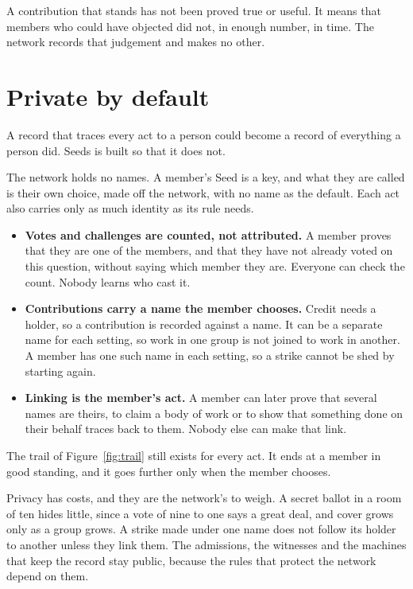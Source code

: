 \documentclass[11pt,a4paper]{article}
\begin{document}
A contribution that stands has not been proved true or useful. It means that members who could have objected did not, in enough number, in time. The network records that judgement and makes no other.

\section{Private by default}
\label{sec:private}

A record that traces every act to a person could become a record of everything a person did. Seeds is built so that it does not.

The network holds no names. A member's Seed is a key, and what they are called is their own choice, made off the network, with no name as the default. Each act also carries only as much identity as its rule needs.

\begin{itemize}
  \item \textbf{Votes and challenges are counted, not attributed.} A member proves that they are one of the members, and that they have not already voted on this question, without saying which member they are. Everyone can check the count. Nobody learns who cast it.
  \item \textbf{Contributions carry a name the member chooses.} Credit needs a holder, so a contribution is recorded against a name. It can be a separate name for each setting, so work in one group is not joined to work in another. A member has one such name in each setting, so a strike cannot be shed by starting again.
  \item \textbf{Linking is the member's act.} A member can later prove that several names are theirs, to claim a body of work or to show that something done on their behalf traces back to them. Nobody else can make that link.
\end{itemize}

The trail of Figure~\ref{fig:trail} still exists for every act. It ends at a member in good standing, and it goes further only when the member chooses.

Privacy has costs, and they are the network's to weigh. A secret ballot in a room of ten hides little, since a vote of nine to one says a great deal, and cover grows only as a group grows. A strike made under one name does not follow its holder to another unless they link them. The admissions, the witnesses and the machines that keep the record stay public, because the rules that protect the network depend on them.
\end{document}

